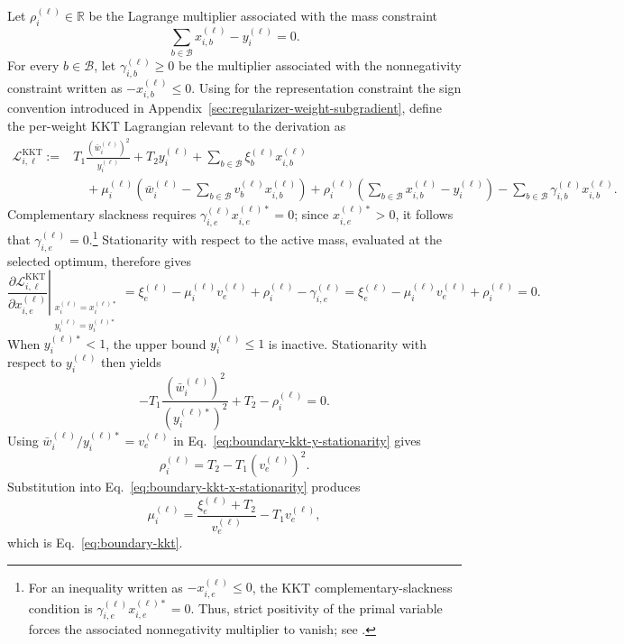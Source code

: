 \documentclass{article}
\begin{document}
Let $\rho_i^{(\ell)}\in\mathbb R$ be the Lagrange multiplier associated with
the mass constraint
\[
  \sum_{b\in\mathcal B}x_{i,b}^{(\ell)}-y_i^{(\ell)}=0.
\]
For every $b\in\mathcal B$, let $\gamma_{i,b}^{(\ell)}\geq0$ be the multiplier
associated with the nonnegativity constraint written as
$-x_{i,b}^{(\ell)}\leq0$.
Using for the representation constraint the sign convention introduced in
Appendix~\ref{sec:regularizer-weight-subgradient}, define the per-weight KKT
Lagrangian relevant to the derivation as
\begin{align*}
  \mathscr L_{i,\ell}^{\mathrm{KKT}}
  :={}&T_1\frac{(\bar w_i^{(\ell)})^2}{y_i^{(\ell)}}
  +T_2y_i^{(\ell)}
  +\sum_{b\in\mathcal B}\xi_b^{(\ell)}x_{i,b}^{(\ell)} \\
  &\quad
  +\mu_i^{(\ell)}
   \left(
     \bar w_i^{(\ell)}
     -\sum_{b\in\mathcal B}v_b^{(\ell)}x_{i,b}^{(\ell)}
   \right)
  +\rho_i^{(\ell)}
   \left(
     \sum_{b\in\mathcal B}x_{i,b}^{(\ell)}-y_i^{(\ell)}
   \right)
  -\sum_{b\in\mathcal B}\gamma_{i,b}^{(\ell)}x_{i,b}^{(\ell)}.
\end{align*}
Complementary slackness requires
$\gamma_{i,e}^{(\ell)}x_{i,e}^{(\ell)*}=0$; since
$x_{i,e}^{(\ell)*}>0$, it follows that
$\gamma_{i,e}^{(\ell)}=0$.\footnote{For an inequality written as
$-x_{i,e}^{(\ell)}\leq0$, the KKT complementary-slackness condition is
$\gamma_{i,e}^{(\ell)}x_{i,e}^{(\ell)*}=0$. Thus, strict positivity of the
primal variable forces the associated nonnegativity multiplier to vanish; see
\citet{bonnans2000perturbation}.} Stationarity with respect to the active mass,
evaluated at the selected optimum, therefore gives
\begin{equation}
  \left.
  \frac{\partial\mathscr L_{i,\ell}^{\mathrm{KKT}}}
       {\partial x_{i,e}^{(\ell)}}
  \right|_{\substack{x_i^{(\ell)}=x_i^{(\ell)*}\\
                     y_i^{(\ell)}=y_i^{(\ell)*}}}
  =\xi_e^{(\ell)}
  -\mu_i^{(\ell)}v_e^{(\ell)}
  +\rho_i^{(\ell)}
  -\gamma_{i,e}^{(\ell)}
  =\xi_e^{(\ell)}
  -\mu_i^{(\ell)}v_e^{(\ell)}
  +\rho_i^{(\ell)}
  =0.
  \label{eq:boundary-kkt-x-stationarity}
\end{equation}
When $y_i^{(\ell)*}<1$, the upper bound $y_i^{(\ell)}\leq1$ is inactive.
Stationarity with respect to $y_i^{(\ell)}$ then yields
\begin{equation}
  -T_1
   \frac{(\bar w_i^{(\ell)})^2}{(y_i^{(\ell)*})^2}
  +T_2
  -\rho_i^{(\ell)}
  =0.
  \label{eq:boundary-kkt-y-stationarity}
\end{equation}
Using
$\bar w_i^{(\ell)}/y_i^{(\ell)*}=v_e^{(\ell)}$ in
Eq.~\eqref{eq:boundary-kkt-y-stationarity} gives
\[
  \rho_i^{(\ell)}
  =T_2-T_1(v_e^{(\ell)})^2.
\]
Substitution into Eq.~\eqref{eq:boundary-kkt-x-stationarity} produces
\[
  \mu_i^{(\ell)}
  =
  \frac{\xi_e^{(\ell)}+T_2}{v_e^{(\ell)}}
  -T_1v_e^{(\ell)},
\]
which is Eq.~\eqref{eq:boundary-kkt}.
\end{document}
